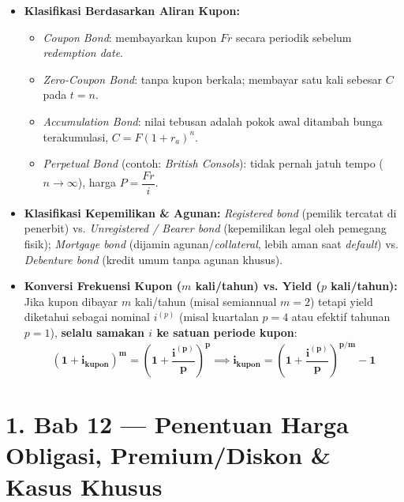 \documentclass[10pt,a4paper]{article}
\begin{document}
\begin{teoremabox}
\begin{itemize}[leftmargin=1.5em, topsep=1pt, itemsep=2pt]
    \item \textbf{Klasifikasi Berdasarkan Aliran Kupon:}
    \begin{itemize}[leftmargin=1.2em, topsep=0.5pt, itemsep=1pt]
        \item \textit{Coupon Bond}: membayarkan kupon $Fr$ secara periodik sebelum \textit{redemption date}.
        \item \textit{Zero-Coupon Bond}: tanpa kupon berkala; membayar satu kali sebesar $C$ pada $t=n$.
        \item \textit{Accumulation Bond}: nilai tebusan adalah pokok awal ditambah bunga terakumulasi, $C = F(1+r_a)^n$.
        \item \textit{Perpetual Bond} (contoh: \textit{British Consols}): tidak pernah jatuh tempo ($n \to \infty$), harga $P = \dfrac{Fr}{i}$.
    \end{itemize}
    \item \textbf{Klasifikasi Kepemilikan \& Agunan:}
    \textit{Registered bond} (pemilik tercatat di penerbit) vs. \textit{Unregistered / Bearer bond} (kepemilikan legal oleh pemegang fisik); \textit{Mortgage bond} (dijamin agunan/\textit{collateral}, lebih aman saat \textit{default}) vs. \textit{Debenture bond} (kredit umum tanpa agunan khusus).
    \item \textbf{Konversi Frekuensi Kupon ($m$ kali/tahun) vs. Yield ($p$ kali/tahun):}
    Jika kupon dibayar $m$ kali/tahun (misal semiannual $m=2$) tetapi yield diketahui sebagai nominal $i^{(p)}$ (misal kuartalan $p=4$ atau efektif tahunan $p=1$), \textbf{selalu samakan $i$ ke satuan periode kupon}:
    \begin{equation*}
        \mathbf{(1 + i_{\text{kupon}})^m = \left(1 + \frac{i^{(p)}}{p}\right)^p} \implies \mathbf{i_{\text{kupon}} = \left(1 + \frac{i^{(p)}}{p}\right)^{p/m} - 1}
    \end{equation*}
\end{itemize}
\end{teoremabox}

\section*{\large 1. Bab 12 --- Penentuan Harga Obligasi, Premium/Diskon \& Kasus Khusus}
\end{document}
